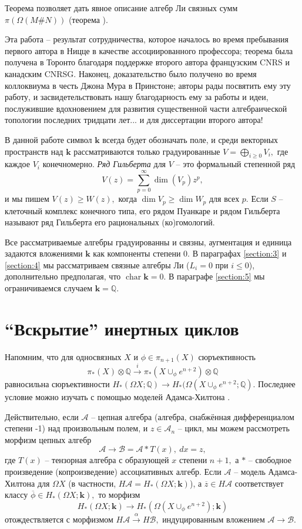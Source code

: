 \documentclass[10pt,a4paper]{article}
\DeclareMathOperator{\cchar}{char}
\def\QQ{\mathbb{Q}}
\def\A{\mathscr{A}}
\def\B{\mathscr{B}}
\def\k{\mathbf{k}}
\def\OX{{\Omega X}}
\theoremstyle{definition}
\begin{document}
Теорема \cite{thm_5.1} позволяет дать явное описание алгебр Ли связных сумм $\pi(\Omega(M\# N))$ (теорема \cite{thm_5.4}).

Эта работа -- результат сотрудничества, которое началось во время пребывания первого автора в Ницце в качестве ассоциированного профессора; теорема \cite{thm_4.1} была получена в Торонто благодаря поддержке второго автора французским CNRS и канадским CNRSG. Наконец, доказательство \cite{thm_5.1} было получено во время коллоквиума в честь Джона Мура в Принстоне; авторы рады посвятить ему эту работу, и засвидетельствовать нашу благодарность ему за работы и идеи, послужившие вдохновением для развития существенной части алгебраической топологии последних тридцати лет... и для диссертации второго автора!

В данной работе символ $\k$ всегда будет обозначать поле, и среди векторных пространств над $\k$ рассматриваются только градуированные $V=\bigoplus_{i\ge 0} V_i,$ где каждое $V_i$ конечномерно. \emph{Ряд Гильберта} для $V$ -- это формальный степенной ряд $$V(z)=\sum_{p=0}^\infty \dim(V_p) z^p,$$ и мы пишем $V(z)\ge W(z),$ когда $\dim V_p\ge \dim W_p$ для всех $p.$ Если $S$ -- клеточный комплекс конечного типа, его рядом Пуанкаре и рядом Гильберта называют ряд Гильберта его рациональных (ко)гомологий.

Все рассматриваемые алгебры градуированны и связны, аугментация и единица задаются вложениями $\k$ как компоненты степени $0.$ В параграфах \ref{section:3} и \ref{section:4} мы рассматриваем связные алгебры Ли ($L_i=0$ при $i\le 0$), дополнительно предполагая, что $\cchar \k=0.$ В параграфе \ref{section:5} мы ограничиваемся случаем $\k=\QQ.$

\tableofcontents
\section{``Вскрытие'' инертных циклов}\label{section:1}
Напомним, что для односвязных $X$ и $\phi\in\pi_{n+1}(X)$ сюръективность
$$\pi_*(X)\otimes \QQ\overset{i}{\longrightarrow} \pi_*(X\cup_\phi e^{n+2})\otimes\QQ$$ равносильна сюръективности $H_*(\OX;\QQ)\to H_*(\Omega(X\cup_\phi e^{n+2};\QQ).$ Последнее условие можно изучать с помощью моделей Адамса-Хилтона \cite{1}.

Действительно, если $\A$ -- цепная алгебра (алгебра, снабжённая дифференциалом степени -1) над произвольным полем, и $z\in \A_n$ -- цикл, мы можем рассмотреть морфизм цепных алгебр
$$\A\to \B=\A\ast T(x),~dx=z,$$ где $T(x)$ -- тензорная алгебра с образующей $x$ степени $n+1,$ а $\ast$ -- свободное произведение (копроизведение) ассоциативных алгебр. Если $\A$ -- модель Адамса-Хилтона для $\OX$ (в частности, $H\A=H_*(\OX;\k)$), а $\overline{z}\in H\A$ соответствует классу $\overline{\phi}\in H_*(\OX;\k),$ то морфизм
$$H_*(\OX;\k)\to H_*(\Omega(X\cup_\phi e^{n+2});\k)$$ отождествляется с морфизмом $H\A\overset{\alpha}{\longrightarrow} H\B,$ индуцированным вложением $\A\to \B.$
\end{document}
